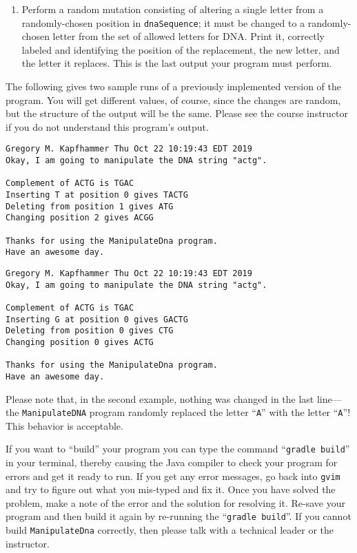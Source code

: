 \documentclass[11pt]{article}
\newcommand{\mainprogram}{\lstinline{ManipulateDna}}
\newcommand{\gradlebuild}{\command{gradle build}}
\newcommand{\command}[1]{``\lstinline{#1}''}
\newcommand{\program}[1]{\lstinline{#1}}
\newcommand{\step}[1]{``{#1}''}
\begin{document}
\begin{enumerate}
\item Perform a random mutation consisting of altering a single letter from a
  randomly-chosen position in {\tt dnaSequence}; it must be changed to a
  randomly-chosen letter from the set of allowed letters for DNA. Print it,
  correctly labeled and identifying the position of the replacement, the new
  letter, and the letter it replaces. This is the last output your program must
  perform.

\end{enumerate}

The following gives two sample runs of a previously implemented version of the
program. You will get different values, of course, since the changes are random,
but the structure of the output will be the same. Please see the course
instructor if you do not understand this program's output.

\begin{verbatim}
Gregory M. Kapfhammer Thu Oct 22 10:19:43 EDT 2019
Okay, I am going to manipulate the DNA string "actg".

Complement of ACTG is TGAC
Inserting T at position 0 gives TACTG
Deleting from position 1 gives ATG
Changing position 2 gives ACGG

Thanks for using the ManipulateDna program.
Have an awesome day.
\end{verbatim}

\begin{verbatim}
Gregory M. Kapfhammer Thu Oct 22 10:19:43 EDT 2019
Okay, I am going to manipulate the DNA string "actg".

Complement of ACTG is TGAC
Inserting G at position 0 gives GACTG
Deleting from position 0 gives CTG
Changing position 0 gives ACTG

Thanks for using the ManipulateDna program.
Have an awesome day.
\end{verbatim}

Please note that, in the second example, nothing was changed in the last
line---the {\tt ManipulateDNA} program randomly replaced the letter ``{\tt A}''
with the letter ``{\tt A}''! This behavior is acceptable.

If you want to \step{build} your program you can type the command \gradlebuild{}
in your terminal, thereby causing the Java compiler to check your program for
errors and get it ready to run. If you get any error messages, go back into
\program{gvim} and try to figure out what you mis-typed and fix it. Once you
have solved the problem, make a note of the error and the solution for resolving
it. Re-save your program and then build it again by re-running the
\gradlebuild{}. If you cannot build \mainprogram{} correctly, then please talk
with a technical leader or the instructor.
\end{document}
